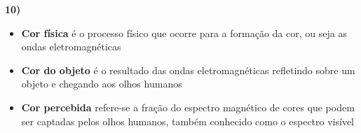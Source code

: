 \textbf{10)} 

\begin{itemize}
	\item \textbf{Cor física} é o processo físico que ocorre para a 
	formação da cor, ou seja as ondas eletromagnéticas
	
	\item \textbf{Cor do objeto} é o resultado das ondas eletromagnéticas 
	refletindo sobre um objeto e chegando aos olhos humanos
	
	\item \textbf{Cor percebida} refere-se a fração do espectro magnético de
	cores que podem ser captadas pelos olhos humanos, também conhecido como 
	o espectro visível
\end{itemize}